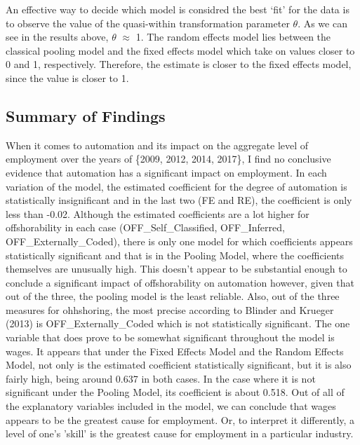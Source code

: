 \documentclass[12pt]{article}
\begin{document}
An effective way to decide which model is considred the best `fit' for the data is to observe the value of the quasi-within transformation parameter $\theta$. As we can see in the results above, $\theta$ $\approx$ 1. The random effects model lies between the classical pooling model and the fixed effects model which take on values closer to 0 and 1, respectively. Therefore, the estimate is closer to the fixed effects model, since the value is closer to 1.

\subsection{Summary of Findings}

\begin{flushleft}
When it comes to automation and its impact on the aggregate level of employment over the years of \{2009, 2012, 2014, 2017\}, I find no conclusive evidence that automation has a significant impact on employment. In each variation of the model, the estimated coefficient for the degree of automation is statistically insignificant and in the last two (FE and RE), the coefficient is only less than -0.02.
\break
\linebreak
Although the estimated coefficients are a lot higher for offshorability in each case (OFF\_Self\_Classified, OFF\_Inferred, OFF\_Externally\_Coded), there is only one model for which coefficients appears statistically significant and that is in the Pooling Model, where the coefficients themselves are unusually high. This doesn't appear to be substantial enough to conclude a significant impact of offshorability on automation however, given that out of the three, the pooling model is the least reliable. Also, out of the three measures for ohhshoring, the most precise according to Blinder and Krueger (2013) is  OFF\_Externally\_Coded which is not statistically significant. 
\break
\linebreak
The one variable that does prove to be somewhat significant throughout the model is wages. It appears that under the Fixed Effects Model and the Random Effects Model, not only is the estimated coefficient statistically significant, but it is also fairly high, being around 0.637 in both cases. In the case where it is not significant under the Pooling Model, its coefficient is about 0.518. Out of all of the explanatory variables included in the model, we can conclude that wages appears to be the greatest cause for employment. Or, to interpret it differently, a level of one's 'skill' is the greatest cause for employment in a particular industry.
\end{flushleft}
\end{document}
